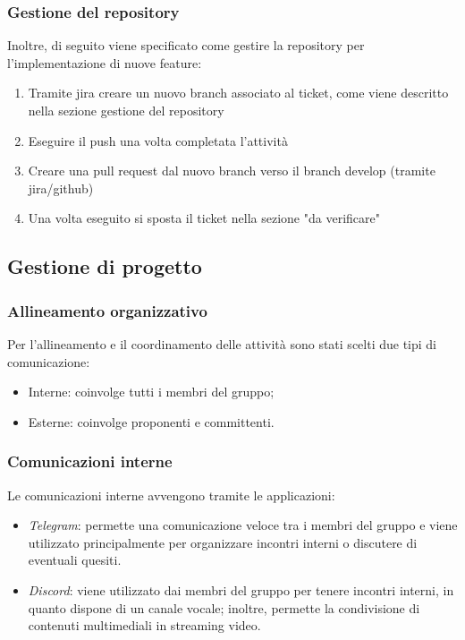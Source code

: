 \subsubsection{Gestione del repository}
Inoltre, di seguito viene specificato come gestire la repository per l'implementazione di nuove feature:
\begin{enumerate}
    \item Tramite jira creare un nuovo branch associato al ticket, come viene descritto nella sezione gestione del repository
    \item Eseguire il push una volta completata l'attività
    \item Creare una pull request dal nuovo branch verso il branch develop (tramite jira/github)
    \item Una volta eseguito si sposta il ticket nella sezione "da verificare"
\end{enumerate}
\subsection{Gestione di progetto}
\subsubsection{Allineamento organizzativo}
Per l'allineamento e il coordinamento delle attività sono stati scelti due tipi di comunicazione:
\begin{itemize}
    \item Interne: coinvolge tutti i membri del gruppo;
    \item Esterne: coinvolge proponenti e committenti.
\end{itemize}

\subsubsection{Comunicazioni interne}
Le comunicazioni interne avvengono tramite le applicazioni:
\begin{itemize}
    \item \textit{Telegram}: permette una comunicazione veloce tra i membri del gruppo e viene utilizzato principalmente per organizzare incontri interni o discutere di eventuali quesiti.
    \item \textit{Discord}: viene utilizzato dai membri del gruppo per tenere incontri interni, in quanto dispone di un canale vocale; inoltre, permette la condivisione di contenuti multimediali in streaming video.
\end{itemize}

